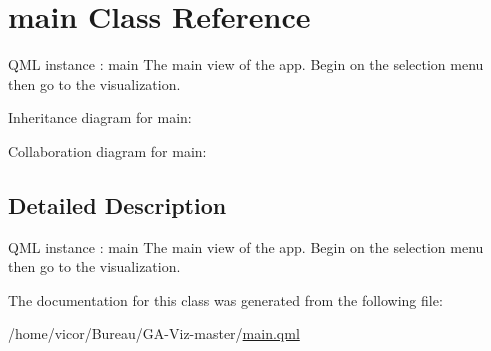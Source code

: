 \hypertarget{classmain}{}\section{main Class Reference}
\label{classmain}


Q\+ML instance \+: main The main view of the app. Begin on the selection menu then go to the visualization.  




Inheritance diagram for main\+:


Collaboration diagram for main\+:


\subsection{Detailed Description}
Q\+ML instance \+: main The main view of the app. Begin on the selection menu then go to the visualization. 

The documentation for this class was generated from the following file\+:\begin{DoxyCompactItemize}
\item 
/home/vicor/\+Bureau/\+G\+A-\/\+Viz-\/master/\hyperlink{main_8qml}{main.\+qml}\end{DoxyCompactItemize}
